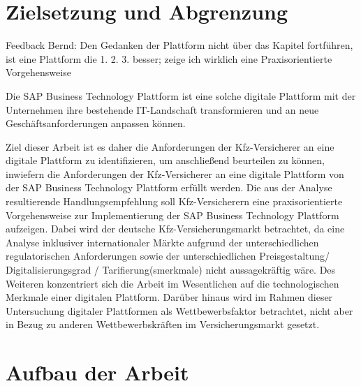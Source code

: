 \section{Zielsetzung und Abgrenzung}

Feedback Bernd: Den Gedanken der Plattform nicht über das Kapitel fortführen, ist eine Plattform die 1. 2. 3. besser; zeige ich wirklich eine Praxisorientierte Vorgehensweise

Die SAP Business Technology Plattform ist eine solche digitale Plattform mit der Unternehmen ihre bestehende IT-Landschaft transformieren und an neue Geschäftsanforderungen anpassen können. 

Ziel dieser Arbeit ist es daher die Anforderungen der Kfz-Versicherer an eine digitale Plattform zu identifizieren, um anschließend beurteilen zu können, inwiefern die Anforderungen der Kfz-Versicherer an eine digitale Plattform von der SAP Business Technology Plattform erfüllt werden. Die aus der Analyse resultierende Handlungsempfehlung soll Kfz-Versicherern eine praxisorientierte Vorgehensweise zur Implementierung der SAP Business Technology Plattform aufzeigen.
Dabei wird der deutsche Kfz-Versicherungsmarkt betrachtet, da eine Analyse inklusiver internationaler Märkte aufgrund der unterschiedlichen regulatorischen Anforderungen sowie der unterschiedlichen Preisgestaltung/ Digitalisierungsgrad / Tarifierung(smerkmale)  nicht aussagekräftig wäre. Des Weiteren konzentriert sich die Arbeit im Wesentlichen auf die technologischen Merkmale einer digitalen Plattform. Darüber hinaus wird im Rahmen dieser Untersuchung digitaler Plattformen als Wettbewerbsfaktor betrachtet, nicht aber in Bezug zu anderen Wettbewerbskräften im Versicherungsmarkt gesetzt.

\newpage
\section{Aufbau der Arbeit}

